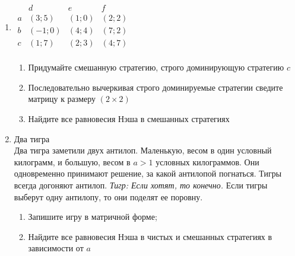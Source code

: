 \documentclass[pdftex,12pt,a4paper]{article}
\begin{document}
\begin{enumerate}
\item $\begin{array}{c|ccc}
& d & e & f \\
\hline
a & (3;5) & (1;0) & (2;2)\\
b & (-1;0) & (4;4) & (7;2)\\
c & (1;7) & (2;3) & (4;7)\\
\end{array}$ 
\begin{enumerate}
\item Придумайте смешанную стратегию, строго доминирующую стратегию $c$ 
\item Последовательно вычеркивая строго доминируемые стратегии сведите матрицу к размеру $(2\times 2)$ 
\item Найдите все равновесия Нэша в смешанных стратегиях 
\end{enumerate}

\item Два тигра \\
Два тигра заметили двух антилоп. Маленькую, весом в один условный килограмм, и большую, весом в $a > 1$ условных килограммов. Они одновременно принимают решение, за какой антилопой погнаться. Тигры всегда догоняют антилоп. \textit{Тигр: Если хотят, то конечно.} Если тигры выберут одну антилопу, то они поделят ее поровну. 
\begin{enumerate}
\item Запишите игру в матричной форме;
\item Найдите все равновесия Нэша в чистых и смешанных стратегиях в зависимости от $a$
\end{enumerate}


\end{enumerate}
\end{document}
